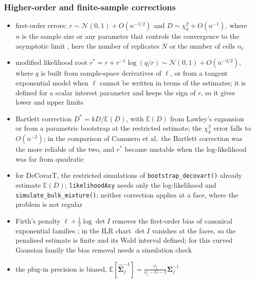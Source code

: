 \subsubsection{Higher-order and finite-sample corrections}
\label{app:mle-firth}

\begin{itemize}
  \item first-order errors: \(r\sim\mathcal{N}(0,1)+O(n^{-1/2})\) and \(D\sim\chi^{2}_{k}+O(n^{-1})\), where \(n\) is the sample
        size or any parameter that controls the convergence to the asymptotic limit
        \cite{canoneroHigherorderAsymptoticCorrections2023}, here the number of replicates \(N\) or the number of
        cells \(n_{i}\)
  \item modified likelihood root \(r^{\ast}=r+r^{-1}\log(q/r)\sim\mathcal{N}(0,1)+O(n^{-3/2})\), where \(q\) is built from
        sample-space derivatives of \(\ell\), or from a tangent exponential model when \(\ell\) cannot be written in
        terms of the estimates; it is defined for a scalar interest parameter and keeps the sign of \(r\), so it
        gives lower and upper limits
  \item Bartlett correction \(D^{\ast}=kD/\mathbb{E}(D)\), with \(\mathbb{E}(D)\) from Lawley's expansion or from a parametric
        bootstrap at the restricted estimate; the \(\chi^{2}_{k}\) error falls to \(O(n^{-2})\); in the comparison of
        Canonero et al.\ the Bartlett correction was the more reliable of the two, and \(r^{\ast}\) became unstable when the
        log-likelihood was far from quadratic \cite{canoneroHigherorderAsymptoticCorrections2023}
  \item for DeCovarT, the restricted simulations of \texttt{bootstrap\_decovart()} already estimate \(\mathbb{E}(D)\);
        \texttt{likelihoodAsy} needs only the log-likelihood and \texttt{simulate\_bulk\_mixture()}; neither
        correction applies at a face, where the problem is not regular
  \item Firth's penalty \(\ell+\tfrac12\log\det I\) removes the first-order bias of canonical exponential families
        \cite{firthBiasReductionMaximum1993}; in the ILR chart \(\det I\) vanishes at the faces, so the penalised
        estimate is finite and its Wald interval defined; for this curved Gaussian family the bias removal needs a
        simulation check
  \item the plug-in precision is biased, \(\mathbb{E}[\hat{\boldsymbol{\Sigma}}_{j}^{-1}]=\tfrac{\nu_{j}}{\nu_{j}-G-1}\boldsymbol{\Sigma}_{j}^{-1}\)

\end{itemize}
